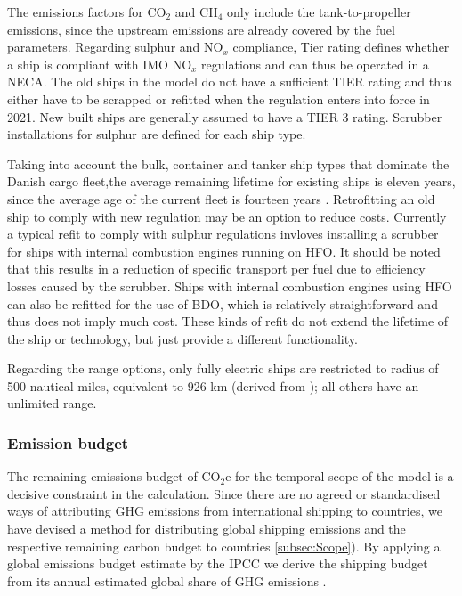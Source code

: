 \documentclass[article]{elsarticle}
\begin{document}
The emissions factors for CO$_2$ and CH$_4$ only include the tank-to-propeller emissions, since the upstream emissions are already covered by the fuel parameters. Regarding sulphur and NO$_x$ compliance, Tier rating defines whether a ship is compliant with IMO NO$_x$ regulations and can thus be operated in a NECA. The old ships in the model do not have a sufficient TIER rating and thus either have to be scrapped or refitted when the regulation enters into force in 2021. New built ships are generally assumed to have a TIER 3 rating. Scrubber installations for sulphur are defined for each ship type.

Taking into account the bulk, container and tanker ship types that dominate the Danish cargo fleet,the average remaining lifetime for existing ships is eleven years, since the average age of the current fleet is fourteen years \cite[Tab.~2.2, p.~27]{UNCTAD2017}. Retrofitting an old ship to comply with new regulation may be an option to reduce costs. Currently a typical refit to comply with sulphur regulations invloves installing a scrubber for ships with internal combustion engines running on HFO. It should be noted that this results in a reduction of specific transport per fuel due to efficiency losses caused by the scrubber. Ships with internal combustion engines using HFO can also be refitted for the use of BDO, which is relatively straightforward and thus does not imply much cost. These kinds of refit do not extend the lifetime of the ship or technology, but just provide a different functionality.

Regarding the range options, only fully electric ships are restricted to radius of 500 nautical miles, equivalent to 926 km (derived from \cite{Stensvold2018a}); all others have an unlimited range.


\subsubsection{Emission budget}
\label{subsec:em_budget}
The remaining emissions budget of CO$_2$e for the temporal scope of the model is a decisive constraint in the calculation. Since there are no agreed or standardised ways of attributing GHG emissions from international shipping to countries, we have devised a method for distributing global shipping emissions and the respective remaining carbon budget to countries \ref{subsec:Scope}). By applying a global emissions budget estimate by the IPCC \cite[Tab.~SPM.3, RCP2.6]{IPCC2013} we derive the shipping budget from its annual estimated global share of GHG emissions \citet{Olmer2017}.
\end{document}

